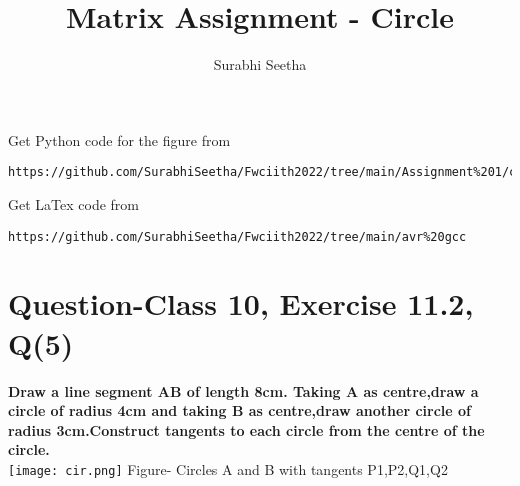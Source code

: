 \documentclass[journal,12pt,twocolumn]{IEEEtran}
\begin{document}
\makeatother
\let\StandardTheFigure\thefigure
\let\vec\mathbf
\renewcommand{\thefigure}{\theproblem}
\def\putbox#1#2#3{\makebox[0in][l]{\makebox[#1][l]{}\raisebox{\baselineskip}[0in][0in]{\raisebox{#2}[0in][0in]{#3}}}}
     \def\rightbox#1{\makebox[0in][r]{#1}}
     \def\centbox#1{\makebox[0in]{#1}}
     \def\topbox#1{\raisebox{-\baselineskip}[0in][0in]{#1}}
     \def\midbox#1{\raisebox{-0.5\baselineskip}[0in][0in]{#1}}
\vspace{3cm}
\title{\textbf{Matrix Assignment - Circle} }
\author{Surabhi Seetha}
\maketitle
\newpage
\bigskip
\renewcommand{\thefigure}{\theenumi}
\renewcommand{\thetable}{\theenumi}
Get Python code for the figure from 
\begin{lstlisting}
https://github.com/SurabhiSeetha/Fwciith2022/tree/main/Assignment%201/codes/src
\end{lstlisting}
Get LaTex code from
\begin{lstlisting}
https://github.com/SurabhiSeetha/Fwciith2022/tree/main/avr%20gcc
\end{lstlisting}
%
\section{Question-Class 10, Exercise 11.2, Q(5)}
\textbf{Draw a line segment AB of length 8cm. Taking A as centre,draw a circle of radius 4cm and taking B as centre,draw another circle of radius 3cm.Construct tangents to each circle from the centre of the circle.} \\


\centering
\texttt{[image: cir.png]}
Figure- Circles A and B with tangents P1,P2,Q1,Q2
\end{document}
